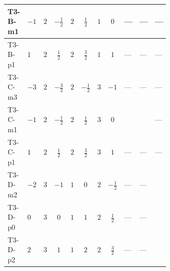 \documentclass[8pt]{article}
\begin{document}
\begin{landscape}
\begin{longtable}{@{}llcccccc >{\raggedright\arraybackslash}p{0.21\linewidth} >{\raggedright\arraybackslash}p{0.21\linewidth} >{\raggedright\arraybackslash}p{0.21\linewidth}@{}}
T3-B-m1 & $-1$ & $2$ & $-\frac{1}{2}$ & $2$ & $\frac{1}{2}$ & $1$ & $0$ & --- & --- & --- \\
\midrule
T3-B-p1 & $1$ & $2$ & $\frac{1}{2}$ & $2$ & $\frac{3}{2}$ & $1$ & $1$ & --- & --- & --- \\
\midrule
T3-C-m3 & $-3$ & $2$ & $-\frac{3}{2}$ & $2$ & $-\frac{1}{2}$ & $3$ & $-1$ & --- & --- & --- \\
\midrule
T3-C-m1 & $-1$ & $2$ & $-\frac{1}{2}$ & $2$ & $\frac{1}{2}$ & $3$ & $0$ & \scriptsize\adjustbox{max width=\linewidth}{$\begin{gathered} +{\lambda_{H H^\dagger S_1^\dagger S_2^\dagger}^{\rm Cross}} \left(-\operatorname{Tr}\!\left({y_1}\,\left({y_2}\right)^{\dagger}\right)-\frac{4}{3} (2 \left({\lambda_{H H^\dagger S_1^\dagger S_2^\dagger}^{\rm Cross}}\right)^{*}+\left({\lambda_{11}}\right)^{*})\right)\end{gathered}$} & \scriptsize\adjustbox{max width=\linewidth}{$\begin{gathered} -\left({\lambda_{H H^\dagger S_1^\dagger S_2^\dagger}^{\rm Cross}}\right)^{*} \operatorname{Tr}\!\left({y_2}\,\left({y_1}\right)^{\dagger}\right)\end{gathered}$} & --- \\
\midrule
T3-C-p1 & $1$ & $2$ & $\frac{1}{2}$ & $2$ & $\frac{3}{2}$ & $3$ & $1$ & --- & --- & --- \\
\midrule
T3-D-m2 & $-2$ & $3$ & $-1$ & $1$ & $0$ & $2$ & $-\frac{1}{2}$ & --- & --- & \scriptsize\adjustbox{max width=\linewidth}{$\begin{gathered} {\lambda_{HS_1}^{(A)}} (2 T_{\nu}^{(1)}+6 \operatorname{Tr}\!\left({Y_d}\,\left({Y_d}\right)^{\dagger}\right)+2 \operatorname{Tr}\!\left({Y_e}\,\left({Y_e}\right)^{\dagger}\right)+6 \operatorname{Tr}\!\left({Y_u}\,\left({Y_u}\right)^{\dagger}\right)+16 {\lambda_{S_1}^{(A)}})\end{gathered}$} \\
\midrule
T3-D-p0 & $0$ & $3$ & $0$ & $1$ & $1$ & $2$ & $\frac{1}{2}$ & --- & --- & \scriptsize\adjustbox{max width=\linewidth}{$\begin{gathered} {\lambda_{HS_1}^{(A)}} (2 T_{\nu}^{(1)}+6 \operatorname{Tr}\!\left({Y_d}\,\left({Y_d}\right)^{\dagger}\right)+2 \operatorname{Tr}\!\left({Y_e}\,\left({Y_e}\right)^{\dagger}\right)+6 \operatorname{Tr}\!\left({Y_u}\,\left({Y_u}\right)^{\dagger}\right)+16 {\lambda_{S_1}^{(A)}})\end{gathered}$} \\
\midrule
T3-D-p2 & $2$ & $3$ & $1$ & $1$ & $2$ & $2$ & $\frac{3}{2}$ & --- & --- & \scriptsize\adjustbox{max width=\linewidth}{$\begin{gathered} {\lambda_{HS_1}^{(A)}} (2 T_{\nu}^{(1)}+6 \operatorname{Tr}\!\left({Y_d}\,\left({Y_d}\right)^{\dagger}\right)+2 \operatorname{Tr}\!\left({Y_e}\,\left({Y_e}\right)^{\dagger}\right)+6 \operatorname{Tr}\!\left({Y_u}\,\left({Y_u}\right)^{\dagger}\right)+16 {\lambda_{S_1}^{(A)}})\end{gathered}$} \\

\end{longtable}
\end{landscape}
\end{document}
